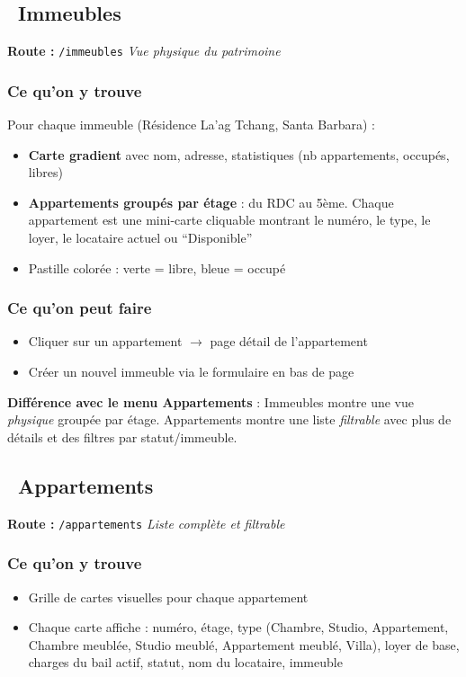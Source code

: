 \documentclass[12pt,a4paper]{article}
\begin{document}
\subsection{\faBuilding\ Immeubles}
\textbf{Route :} \texttt{/immeubles} \hfill \textit{Vue physique du patrimoine}

\subsubsection{Ce qu'on y trouve}
Pour chaque immeuble (R\'esidence La'ag Tchang, Santa Barbara) :
\begin{itemize}
\item \textbf{Carte gradient} avec nom, adresse, statistiques (nb appartements, occup\'es, libres)
\item \textbf{Appartements group\'es par \'etage} : du RDC au 5\`eme. Chaque appartement est une mini-carte cliquable montrant le num\'ero, le type, le loyer, le locataire actuel ou ``Disponible''
\item Pastille color\'ee : \textcolor{vertOk}{verte} = libre, \textcolor{immoCiel}{bleue} = occup\'e
\end{itemize}

\subsubsection{Ce qu'on peut faire}
\begin{itemize}
\item Cliquer sur un appartement $\rightarrow$ page d\'etail de l'appartement
\item Cr\'eer un nouvel immeuble via le formulaire en bas de page
\end{itemize}

\begin{infobox}
\textbf{Diff\'erence avec le menu Appartements} : Immeubles montre une vue \textit{physique} group\'ee par \'etage. Appartements montre une liste \textit{filtrable} avec plus de d\'etails et des filtres par statut/immeuble.
\end{infobox}

\subsection{\faHome\ Appartements}
\textbf{Route :} \texttt{/appartements} \hfill \textit{Liste compl\`ete et filtrable}

\subsubsection{Ce qu'on y trouve}
\begin{itemize}
\item Grille de cartes visuelles pour chaque appartement
\item Chaque carte affiche : num\'ero, \'etage, type (Chambre, Studio, Appartement, Chambre meubl\'ee, Studio meubl\'e, Appartement meubl\'e, Villa), loyer de base, charges du bail actif, statut, nom du locataire, immeuble
\end{itemize}
\end{document}
